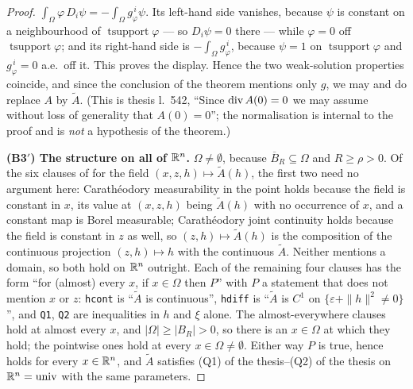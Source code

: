 \begin{proof}
$\int_\Omega\varphi\,D_i\psi=-\int_\Omega g_\varphi^{\,i}\psi$.  Its left-hand
side vanishes, because $\psi$ is constant on a neighbourhood of
$\operatorname{tsupport}\varphi$ --- so $D_i\psi=0$ there --- while $\varphi=0$
off $\operatorname{tsupport}\varphi$; and its right-hand side is
$-\int_\Omega g_\varphi^{\,i}$, because $\psi=1$ on
$\operatorname{tsupport}\varphi$ and $g_\varphi^{\,i}=0$ a.e.\ off it.  This
proves the display.  Hence the two weak-solution properties coincide, and since
the conclusion of the theorem mentions only $g$, we may and do replace $A$ by
$\widetilde A$.  (This is thesis l.~542, ``Since $\operatorname{div} A(0)=0$ we may assume
without loss of generality that $A(0)=0$''; the normalisation is internal to the
proof and is \emph{not} a hypothesis of the theorem.)

\textbf{(B3$'$) The structure on all of $\mathbb{R}^n$.}  $\Omega\ne\emptyset$, because
$\overline B_R\subseteq\Omega$ and $R\ge\rho>0$.  Of the six clauses of
 for the field $(x,z,h)\mapsto\widetilde A(h)$,
the first two need no argument here: Carath\'eodory measurability in the point
holds because the field is constant in $x$, its value at $(x,z,h)$ being
$\widetilde A(h)$ with no occurrence of $x$, and a constant map is Borel
measurable; Carath\'eodory joint continuity holds because the field is constant
in $z$ as well, so $(z,h)\mapsto\widetilde A(h)$ is the composition of the
continuous projection $(z,h)\mapsto h$ with the continuous $\widetilde A$.
Neither mentions a domain, so both hold on $\mathbb{R}^n$ outright.  Each of the
remaining four clauses has the form ``for (almost) every $x$, if $x\in\Omega$ then $P$'' with $P$ a
statement that does not mention $x$ or $z$: \texttt{hcont} is
``$\widetilde A$ is continuous'', \texttt{hdiff} is
``$\widetilde A$ is $C^1$ on $\{\varepsilon+\|h\|^2\ne0\}$'', and \texttt{Q1},
\texttt{Q2} are inequalities in $h$ and $\xi$ alone.  The almost-everywhere
clauses hold at almost every $x$, and $|\Omega|\ge|B_R|>0$, so there is an $x\in\Omega$
at which they hold; the pointwise ones hold at every $x\in\Omega\ne\emptyset$.
Either way $P$ is true, hence holds for every $x\in\mathbb{R}^n$, and
$\widetilde A$ satisfies (Q1) of the thesis--(Q2) of the thesis on $\mathbb{R}^n=\mathrm{univ}$
with the same parameters.


\end{proof}
